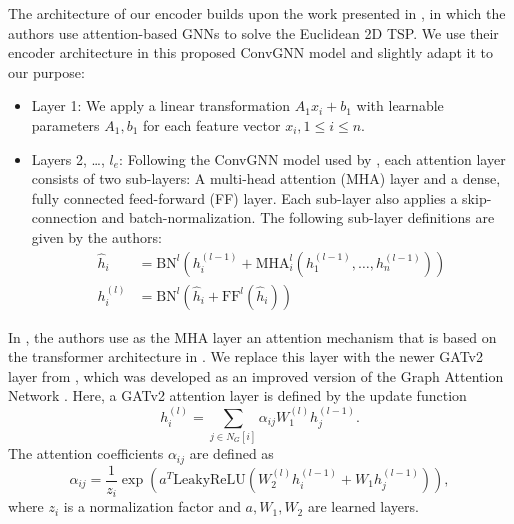 \documentclass[draft,final]{vutinfth} %
\begin{document}
The architecture of our encoder builds upon the work presented in \cite{Kool2019}, in which the authors use attention-based GNNs to solve the Euclidean 2D TSP. We use their encoder architecture in this proposed ConvGNN model and slightly adapt it to our purpose:
\begin{itemize}
    \item Layer 1: We apply a linear transformation $A_1 x_i + b_1$ with learnable parameters $A_1, b_1$ for each feature vector $x_i, 1 \leq i \leq n$.
    \item Layers 2, \dots, $l_e$: Following the ConvGNN model used by \cite{Kool2019}, each attention layer consists of two sub-layers: A multi-head attention (MHA) layer and a dense, fully connected feed-forward (FF) layer. Each sub-layer also applies a skip-connection and batch-normalization. The following sub-layer definitions are given by the authors: 
    \begin{align*}
        \hat{h}_i &= \text{BN}^l(h_i^{(l-1)} + \mathrm{MHA}_i^l (h_1^{(l-1)}, \dots , h_n^{(l-1)}) ) \\
        h_i^{(l)} &= \text{BN}^l(\hat{h}_i + \mathrm{FF}^l(\hat{h}_i))
    \end{align*}
\end{itemize}
In \cite{Kool2019}, the authors use as the MHA layer an attention mechanism that is based on the transformer architecture in \cite{VaswaniSPUJGKP17}. We replace this layer with the newer GATv2 layer from \cite{Brody2021}, which was developed as an improved version of the Graph Attention Network \cite{Velickovic2018}. Here, a GATv2 attention layer is defined by the update function 
\[
    h_i^{(l)} = \sum_{j \in N_G[i]} \alpha_{ij} W_{1}^{(l)} h_j^{(l-1)}.    
\]
The attention coefficients $\alpha_{ij}$ are defined as 
\[
    \alpha_{ij} = \frac{1}{z_i} \exp(a^T \mathrm{LeakyReLU}(W_2^{(l)}h_i^{(l-1)} + W_1 h_j^{(l-1)} )),    
\]
where $z_i$ is a normalization factor and $a, W_1, W_2$ are learned layers. 
\end{document}

